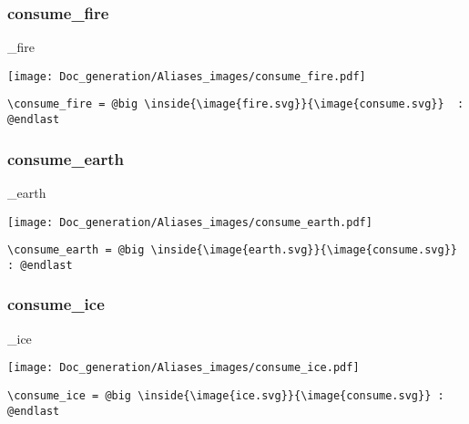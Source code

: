 \documentclass{article}
\begin{document}
\subsubsection{consume\_fire}
\begin{minipage}{0.45\linewidth}
\raggedright
\begin{spverbatim}
\consume_fire
\end{spverbatim}
\end{minipage}
\begin{minipage}{0.45\linewidth}
\raggedleft
\texttt{[image: Doc\_generation/Aliases\_images/consume\_fire.pdf]}
\end{minipage}
\begin{center}
\begin{BVerbatim}
\consume_fire = @big \inside{\image{fire.svg}}{\image{consume.svg}}  : @endlast
\end{BVerbatim}
\end{center}

\subsubsection{consume\_earth}
\begin{minipage}{0.45\linewidth}
\raggedright
\begin{spverbatim}
\consume_earth
\end{spverbatim}
\end{minipage}
\begin{minipage}{0.45\linewidth}
\raggedleft
\texttt{[image: Doc\_generation/Aliases\_images/consume\_earth.pdf]}
\end{minipage}
\begin{center}
\begin{BVerbatim}
\consume_earth = @big \inside{\image{earth.svg}}{\image{consume.svg}} : @endlast
\end{BVerbatim}
\end{center}

\subsubsection{consume\_ice}
\begin{minipage}{0.45\linewidth}
\raggedright
\begin{spverbatim}
\consume_ice
\end{spverbatim}
\end{minipage}
\begin{minipage}{0.45\linewidth}
\raggedleft
\texttt{[image: Doc\_generation/Aliases\_images/consume\_ice.pdf]}
\end{minipage}
\begin{center}
\begin{BVerbatim}
\consume_ice = @big \inside{\image{ice.svg}}{\image{consume.svg}} : @endlast
\end{BVerbatim}
\end{center}
\end{document}
